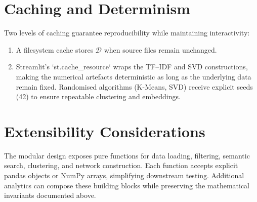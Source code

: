 \documentclass[11pt]{article}
\begin{document}
\section{Caching and Determinism}
Two levels of caching guarantee reproducibility while maintaining interactivity:
\begin{enumerate}
  \item A filesystem cache stores $\mathcal{D}$ when source files remain unchanged.
  \item Streamlit's `st.cache_resource` wraps the TF--IDF and SVD constructions, making the numerical artefacts deterministic as long as the underlying data remain fixed. Randomised algorithms (K-Means, SVD) receive explicit seeds (42) to ensure repeatable clustering and embeddings.
\end{enumerate}

\section{Extensibility Considerations}
The modular design exposes pure functions for data loading, filtering, semantic search, clustering, and network construction. Each function accepts explicit pandas objects or NumPy arrays, simplifying downstream testing. Additional analytics can compose these building blocks while preserving the mathematical invariants documented above.
\end{document}
